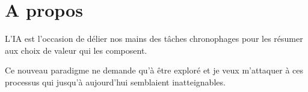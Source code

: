 \section{A propos}

L'IA est l'occasion de délier nos mains des tâches chronophages pour les résumer aux choix de valeur qui les composent.

Ce nouveau paradigme ne demande qu'à être exploré et je veux m'attaquer à ces processus qui jusqu'à aujourd'hui semblaient inatteignables.
\sectionspace %
